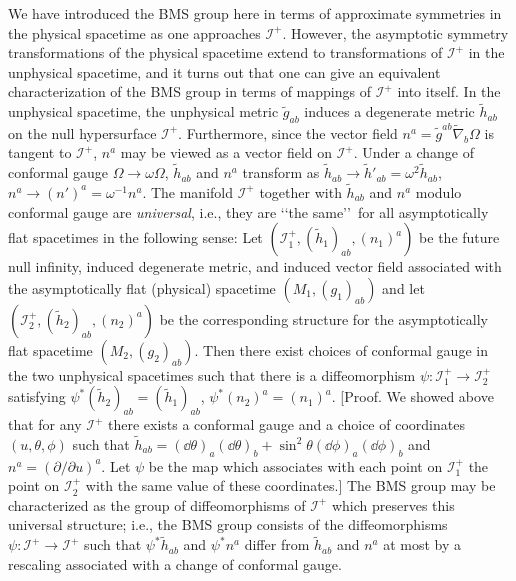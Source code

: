 We have introduced the BMS group here in terms of approximate symmetries in the
physical spacetime as one approaches \(\mathcal I^+\). However, the asymptotic
symmetry transformations of the physical spacetime extend to transformations of
\(\mathcal I^+\) in the unphysical spacetime, and it turns out that one can give an
equivalent characterization of the BMS group in terms of mappings of
\(\mathcal I^+\) into itself. In the unphysical spacetime, the unphysical metric
\(\tilde g_{ab}\) induces a degenerate metric \(\tilde h_{ab}\) on the null
hypersurface \(\mathcal I^+\). Furthermore, since the vector field
\(n^a=\tilde g^{ab}\tilde\nabla_b\Omega\) is tangent to \(\mathcal I^+\), \(n^a\) may
be viewed as a vector field on \(\mathcal I^+\). Under a change of conformal gauge
\(\Omega\to\omega\Omega\), \(\tilde h_{ab}\) and \(n^a\) transform as
\(\tilde h_{ab}\to\tilde h'_{ab}=\omega^2\tilde h_{ab}\),
\(n^a\to(n')^a=\omega^{-1}n^a\). The manifold \(\mathcal I^+\) together with
\(\tilde h_{ab}\) and \(n^a\) modulo conformal gauge are \emph{universal}, i.e.,
they are \lq\lq the same\rq\rq\ for all asymptotically flat spacetimes in the following
sense: Let \((\mathcal I_1^+,(\tilde h_1)_{ab},(n_1)^a)\) be the future null infinity,
induced degenerate metric, and induced vector field associated with the
asymptotically flat (physical) spacetime \((M_1,(g_1)_{ab})\) and let
\((\mathcal I_2^+,(\tilde h_2)_{ab},(n_2)^a)\) be the corresponding structure for the
asymptotically flat spacetime \((M_2,(g_2)_{ab})\). Then there exist choices of
conformal gauge in the two unphysical spacetimes such that there is a
diffeomorphism \(\psi:\mathcal I_1^+\to\mathcal I_2^+\) satisfying
\(\psi^*(\tilde h_2)_{ab}=(\tilde h_1)_{ab}\),
\(\psi^*(n_2)^a=(n_1)^a\). [Proof. We showed above that for any
\(\mathcal I^+\) there exists a conformal gauge and a choice of coordinates
\((u,\theta,\phi)\) such that
\(\tilde h_{ab}=(\dd\theta)_a(\dd\theta)_b+
\sin^2\theta(\dd\phi)_a(\dd\phi)_b\) and \(n^a=(\partial/\partial u)^a\). Let
\(\psi\) be the map which associates with each point on \(\mathcal I_1^+\) the point
on \(\mathcal I_2^+\) with the same value of these coordinates.] The BMS group may
be characterized as the group of diffeomorphisms of \(\mathcal I^+\) which preserves
this universal structure; i.e., the BMS group consists of the diffeomorphisms
\(\psi:\mathcal I^+\to\mathcal I^+\) such that \(\psi^*\tilde h_{ab}\) and
\(\psi^*n^a\) differ from \(\tilde h_{ab}\) and \(n^a\) at most by a rescaling
associated with a change of conformal gauge.

